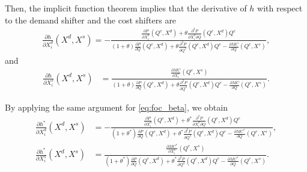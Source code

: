 \documentclass[11pt, a4paper]{article}
\theoremstyle{remark}
\begin{document}
Then, the implicit function theorem implies that the derivative of $h$ with respect to the demand shifter and the cost shifters are
\begin{align}
    \frac{\partial h}{\partial X^{d}_{i}}(X^{d}, X^{s}) = -\frac{\frac{\partial P}{\partial X^{d}_{i}}(Q^e, X^{d}) + \theta\frac{\partial^2 P}{\partial X^{d}_{i}\partial Q}(Q^e, X^{d})Q^e }{(1+\theta)\frac{\partial P}{\partial Q}(Q^e, X^{d}) + \theta\frac{\partial^2 P}{\partial Q^2}(Q^e, X^{d})Q^e - \frac{\partial MC}{\partial Q}(Q^e, X^{s})}, \label{eq:foc_derivative_demand}
\end{align}
and
\begin{align}
    \frac{\partial h}{\partial X^{s}_{i}}(X^{d}, X^{s}) & = \frac{\frac{\partial MC}{\partial X^{s}_{i}}(Q^e, X^{s})}{(1+\theta)\frac{\partial P}{\partial Q}(Q^e, X^{d}) + \theta\frac{\partial^2 P}{\partial Q^2}(Q^e, X^{d})Q^e - \frac{\partial MC}{\partial Q}(Q^e, X^{s})}. \label{eq:foc_derivative_supply}
\end{align}


By applying the same argument for \eqref{eq:foc_beta}, we obtain 
\begin{align}
    \frac{\partial h^{*}}{\partial X^{d}_{i}}(X^{d}, X^{s}) &= -\frac{\frac{\partial P}{\partial X^{d}_{i}}(Q^e, X^{d}) + \theta^{*}\frac{\partial^2 P}{\partial X^{d}_{i}\partial Q}(Q^e, X^{d})Q^e }{(1+\theta^{*})\frac{\partial P}{\partial Q}(Q^e, X^{d}) + \theta^{*}\frac{\partial^2 P}{\partial Q^2}(Q^e, X^{d})Q^e - \frac{\partial MC^{*}}{\partial Q}(Q^e, X^{s})}, \\
    \frac{\partial h^{*}}{\partial X^{s}_{i}}(X^{d}, X^{s}) & = \frac{\frac{\partial MC^{*}}{\partial X^{s}_{i}}(Q^e, X^{s})}{(1+\theta^{*})\frac{\partial P}{\partial Q}(Q^e, X^{d}) + \theta^{*}\frac{\partial^2 P}{\partial Q^2}(Q^e, X^{d})Q^e - \frac{\partial MC^{*}}{\partial Q}(Q^e, X^{s})}.
\end{align}
\end{document}
